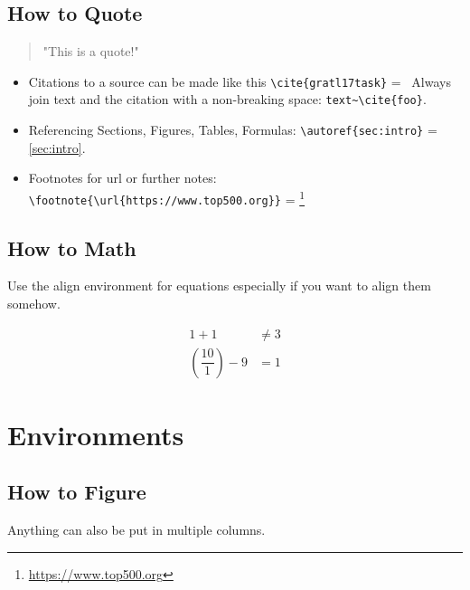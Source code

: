 \documentclass[11pt,
               a4paper,
               bibtotoc,
               idxtotoc,
               headsepline,
               footsepline,
               footexclude,
               BCOR12mm,
               DIV13,
               openany,   %
               ]
               {scrbook}
\begin{document}
\subsection{How to Quote}

\begin{quote}
    "This is a quote!"
\end{quote}

\begin{itemize}
    \item Citations to a source can be made like this \verb|\cite{gratl17task}| =~\cite{gratl17task}
    \subitem Always join text and the citation with a non-breaking space: \verb|text~\cite{foo}|.
    \item Referencing Sections, Figures, Tables, Formulas: \verb|\autoref{sec:intro}| = \autoref{sec:intro}.
    \item Footnotes for url or further notes: \verb|\footnote{\url{https://www.top500.org}}| = \footnote{\url{https://www.top500.org}}
\end{itemize}

\subsection{How to Math}

Use the align environment for equations especially if you want to align them somehow.

\begin{align}
1 + 1 &\ne 3\\
\left(\dfrac{10}{1}\right) - 9 &= 1
\end{align}

\clearpage

\section{Environments}

\subsection{How to Figure}

Anything can also be put in multiple columns.
\end{document}
